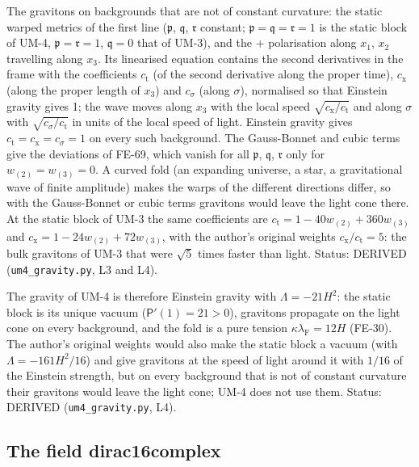 \documentclass[
  10pt,
]{article}
\begin{document}
The gravitons on backgrounds that are not of constant curvature: the
static warped metrics of the first line (\(\mathfrak{p}\),
\(\mathfrak{q}\), \(\mathfrak{r}\) constant;
\(\mathfrak{p} = \mathfrak{q} = \mathfrak{r} = 1\) is the static block
of UM-4, \(\mathfrak{p} = \mathfrak{r} = 1\), \(\mathfrak{q} = 0\) that
of UM-3), and the + polarisation along \(x_1\), \(x_2\) travelling along
\(x_3\). Its linearised equation contains the second derivatives in the
frame with the coefficients \(c_{\mathrm{t}}\) (of the second derivative
along the proper time), \(c_{\mathrm{x}}\) (along the proper length of
\(x_3\)) and \(c_\sigma\) (along \(\sigma\)), normalised so that
Einstein gravity gives 1; the wave moves along \(x_3\) with the local
speed \(\sqrt{c_{\mathrm{x}}/c_{\mathrm{t}}}\) and along \(\sigma\) with
\(\sqrt{c_\sigma/c_{\mathrm{t}}}\) in units of the local speed of light.
Einstein gravity gives
\(c_{\mathrm{t}} = c_{\mathrm{x}} = c_\sigma = 1\) on every such
background. The Gauss-Bonnet and cubic terms give the deviations of
FE-69, which vanish for all \(\mathfrak{p}\), \(\mathfrak{q}\),
\(\mathfrak{r}\) only for \(w_{(2)} = w_{(3)} = 0\). A curved fold (an
expanding universe, a star, a gravitational wave of finite amplitude)
makes the warps of the different directions differ, so with the
Gauss-Bonnet or cubic terms gravitons would leave the light cone there.
At the static block of UM-3 the same coefficients are
\(c_{\mathrm{t}} = 1 - 40w_{(2)} + 360w_{(3)}\) and
\(c_{\mathrm{x}} = 1 - 24w_{(2)} + 72w_{(3)}\), with the author's
original weights \(c_{\mathrm{x}}/c_{\mathrm{t}} = 5\): the bulk
gravitons of UM-3 that were \(\sqrt5\) times faster than light. Status:
DERIVED (\texttt{um4\_gravity.py}, L3 and L4).

The gravity of UM-4 is therefore Einstein gravity with
\(\Lambda = -21H^2\): the static block is its unique vacuum
(\(\mathsf{P}'(1) = 21 > 0\)), gravitons propagate on the light cone on
every background, and the fold is a pure tension
\(\kappa\lambda_{\mathrm{F}} = 12H\) (FE-30). The author's original
weights would also make the static block a vacuum (with
\(\Lambda = -161H^2/16\)) and give gravitons at the speed of light
around it with \(1/16\) of the Einstein strength, but on every
background that is not of constant curvature their gravitons would leave
the light cone; UM-4 does not use them. Status: DERIVED
(\texttt{um4\_gravity.py}, L4).

\hypertarget{the-field-dirac16complex}{%
\subsection{The field dirac16complex}\label{the-field-dirac16complex}}
\end{document}
